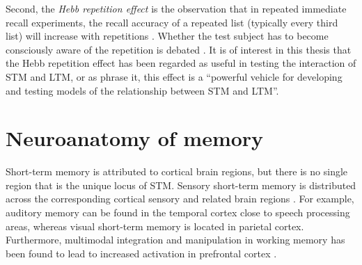 Second, the \emph{Hebb repetition effect} is the observation that in repeated immediate recall experiments, the recall accuracy of a repeated list (typically every third list) will increase with repetitions \parencite{Hebb1961}.
Whether the test subject has to become consciously aware of the repetition is debated \parencite{Stadler1993}.
It is of interest in this thesis that the Hebb repetition effect has been regarded as useful in testing the interaction of STM and LTM, or as \textcite{Burgess2005} phrase it, this effect is  a ``powerful vehicle for developing and testing models of the relationship between STM and LTM''.


\section{Neuroanatomy of memory}
Short-term memory is attributed to cortical brain regions, but there is no single region that is the unique locus of STM\@.
Sensory short-term memory is distributed across the corresponding cortical sensory and related brain regions \parencite{zelano2009,todd2004,baldo2012}.
For example, auditory memory can be found in the temporal cortex close to speech processing areas, whereas visual short-term memory is located in parietal cortex.
Furthermore, multimodal integration and manipulation in working memory has been found to lead to increased activation in prefrontal cortex \parencite{rypma1999}.

